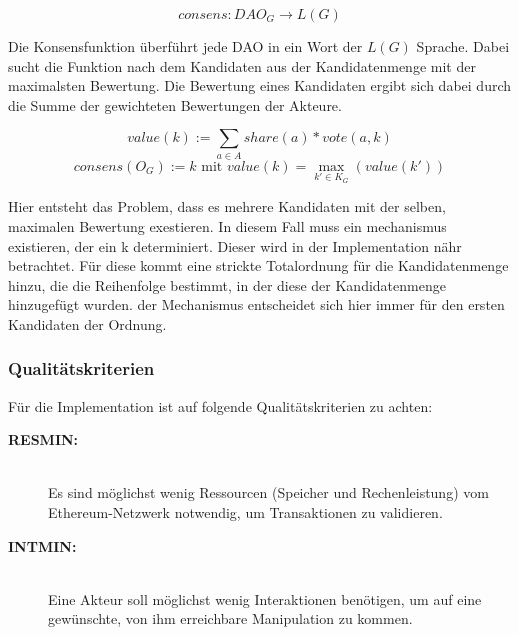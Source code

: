 \documentclass[]{article}
\begin{document}
  \[consens: DAO_G \rightarrow L(G)\] 


Die Konsensfunktion überführt jede DAO in ein Wort der $L(G)$ Sprache.
Dabei sucht die Funktion nach dem Kandidaten aus der Kandidatenmenge mit der maximalsten Bewertung. Die Bewertung eines Kandidaten ergibt sich dabei durch die Summe der gewichteten Bewertungen der Akteure.

\[ value(k) := \sum_{a\in A} share(a) * vote(a,k) \] 
\[consens (O_G) := k\text{ mit }value(k) = \max_{k'\in K_G} (value(k'))\]

Hier entsteht das Problem, dass es mehrere Kandidaten mit der selben, maximalen Bewertung exestieren. In diesem Fall muss ein mechanismus existieren, der ein k determiniert. Dieser wird in der Implementation nähr betrachtet. Für diese kommt eine strickte Totalordnung für die Kandidatenmenge hinzu, die die Reihenfolge bestimmt, in der diese der Kandidatenmenge hinzugefügt wurden. der Mechanismus entscheidet sich hier immer für den ersten Kandidaten der Ordnung.





\subsubsection*{Qualitätskriterien}

Für die Implementation ist auf folgende Qualitätskriterien zu achten:

\begin{description} 
  \item[\textbf{RESMIN:}]\hfill \\
    Es sind möglichst wenig Ressourcen (Speicher und Rechenleistung) vom Ethereum-Netzwerk notwendig, um Transaktionen zu validieren.
  \item[\textbf{INTMIN:}]\hfill \\
    Eine Akteur soll möglichst wenig Interaktionen benötigen, um auf eine gewünschte, von ihm erreichbare Manipulation zu kommen.
\end{description}
\end{document}
